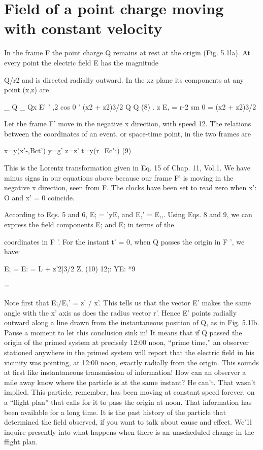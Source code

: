 \section{Field of a point charge moving with constant velocity}
In the frame F the point charge Q remains at rest at the origin
(Fig. 5.1la). At every point the electric field E has the magnitude

 

Q/r2 and is directed radially outward. In the xz plane its components
at any point (x,z) are

\begin{equation}
\end{equation}
_ Q _ Qx
E' ' ,2 cos 0 ' (x2 + z2)3/2
Q Q (8)
. z
E, = r-2 sm 0 = (x2 + z2)3/2

Let the frame F' move in the negative x direction, with speed 12. The
relations between the coordinates of an event, or space-time point,
in the two frames are

\begin{equation}
\end{equation}
x=y(x'-,Bct') y=g' z=z' t=y(r_Ec"i) (9)

This is the Lorentz transformation given in Eq. 15 of Chap. 11, Vol.1.
We have minus signs in our equations above because our frame F' is
moving in the negative x direction, seen from F. The clocks have
been set to read zero when x': O and x' = 0 coincide.

According to Eqs. 5 and 6, E; = 'yE, and E,' = E,,. Using Eqs. 8
and 9, we can express the field components E; and E; in terms of the

coordinates in F '. For the instant t' = 0, when Q passes the origin
in F ', we have:

\begin{equation}
\end{equation}
E; = E: = L
 + z'2]3/2
Z, (10)
12;: YE: *9

= 

Note first that E;/E,' = z' / x'. This tells us that the vector E' makes
the same angle with the x' axis as does the radius vector r'. Hence
E' points radially outward along a line drawn from the instantaneous
position of Q, as in Fig. 5.1lb. Pause a moment to let this conclusion
sink in! It means that if Q passed the origin of the primed system at
precisely 12:00 noon, ``prime time,'' an observer stationed anywhere
in the primed system will report that the electric field in his vicinity
was pointing, at 12:00 noon, exactly radially from the origin. This
sounds at first like instantaneous transmission of information! How
can an observer a mile away know where the particle is at the same
instant? He can't. That wasn't implied. This particle, remember,
has been moving at constant speed forever, on a ``ffight plan'' that
calls for it to pass the origin at noon. That information has been
available for a long time. It is the past history of the particle that
determined the field observed, if you want to talk about cause and
effect. We'1l inquire presently into what happens when there is an
unscheduled change in the ffight plan.

